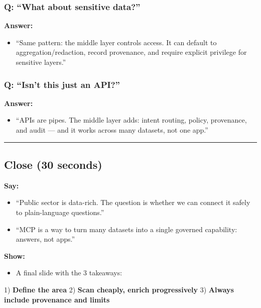 \subsubsection{Q: “What about sensitive data?”}
\textbf{Answer:}
\begin{itemize}[leftmargin=*]
\item “Same pattern: the middle layer controls access. It can default to aggregation/redaction, record provenance, and require explicit privilege for sensitive layers.” \cite{ico_ai_data_protection,five_safes_framework,data_ai_ethics_framework}
\end{itemize}

\subsubsection{Q: “Isn’t this just an API?”}
\textbf{Answer:}
\begin{itemize}[leftmargin=*]
\item “APIs are pipes. The middle layer adds: intent routing, policy, provenance, and audit — and it works across many datasets, not one app.” \cite{mcp_spec_2025_11_25,prov_o,algorithmic_transparency_recording_standard}
\end{itemize}

\par\medskip\hrule\medskip

\subsection{Close (30 seconds)}
\textbf{Say:}
\begin{itemize}[leftmargin=*]
\item “Public sector is data-rich. The question is whether we can connect it safely to plain-language questions.”
\item “MCP is a way to turn many datasets into a single governed capability: answers, not apps.” \cite{mcp_spec_2025_11_25,data_ai_ethics_framework}
\end{itemize}

\textbf{Show:}
\begin{itemize}[leftmargin=*]
\item A final slide with the 3 takeaways:
\end{itemize}
  1) \textbf{Define the area}
  2) \textbf{Scan cheaply, enrich progressively}
  3) \textbf{Always include provenance and limits}
